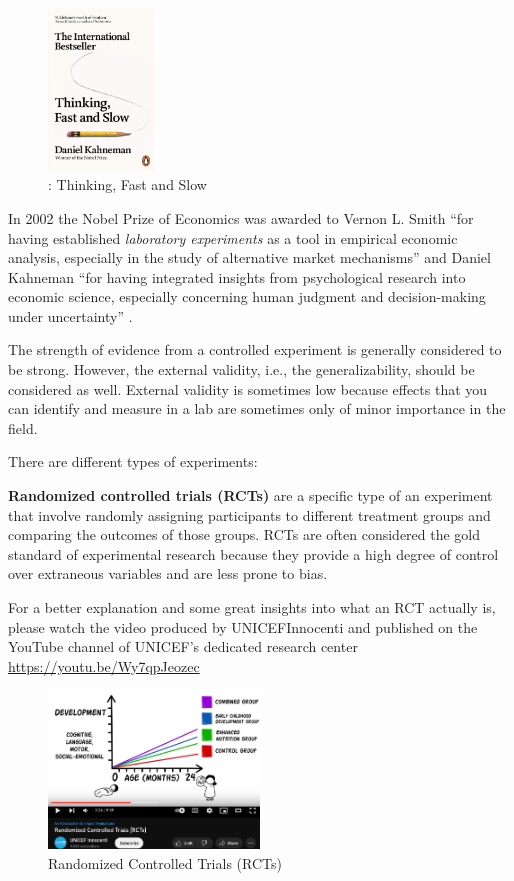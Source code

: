 \documentclass[
  12pt,
  oneside]{book}
\theoremstyle{definition}
\theoremstyle{definition}
\theoremstyle{definition}
\theoremstyle{definition}
\theoremstyle{remark}
\begin{document}
\begin{figure}
\centering
\includegraphics[width=0.25\textwidth,height=\textheight]{fig/tfts.jpg}
\caption{\citet{Kahneman2011Thinking}: Thinking, Fast and Slow}
\end{figure}

In 2002 the Nobel Prize of Economics was awarded to Vernon L. Smith ``for having established \emph{laboratory experiments} as a tool in empirical economic analysis, especially in the study of alternative market mechanisms'' \citep{RSAS2002} and Daniel Kahneman ``for having integrated insights from psychological research into economic science, especially concerning human judgment and decision-making under uncertainty'' \citep{RSAS2002}.

The strength of evidence from a controlled experiment is generally considered to be strong. However, the external validity, i.e., the generalizability, should be considered as well. External validity is sometimes low because effects that you can identify and measure in a lab are sometimes only of minor importance in the field.

There are different types of experiments:

\textbf{Randomized controlled trials (RCTs)} are a specific type of an experiment that involve randomly assigning participants to different treatment groups and comparing the outcomes of those groups. RCTs are often considered the gold standard of experimental research because they provide a high degree of control over extraneous variables and are less prone to bias.

For a better explanation and some great insights into what an RCT actually is, please watch the video produced by UNICEFInnocenti and published on the YouTube channel of UNICEF's dedicated research center \url{https://youtu.be/Wy7qpJeozec}

\begin{figure}
\centering
\includegraphics[width=0.5\textwidth,height=\textheight]{fig/rcts-video.png}
\caption{\label{fig:rcts} Randomized Controlled Trials (RCTs)}
\end{figure}
\end{document}
